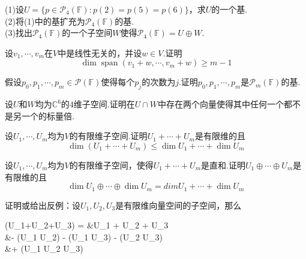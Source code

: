 \documentclass[lang=cn, zihao=5]{elegantbook}
\newcommand{\C}{\mathbb{C}}
\newcommand{\F}{\mathbb{F}}
\DeclareMathOperator{\spn}{span}
\begin{document}
\begin{exercise}
	(1)设$U=\{ p \in \mathcal{P}_{4} (\F) : p(2)=p(5)=p(6) \}$，求$U$的一个基. \\
	(2)将(1)中的基扩充为$\mathcal{P}_{4} (\F)$的基. \\
	(3)找出$\mathcal{P}_{4} (\F)$的一个子空间$W$使得$\mathcal{P}_{4} (\F) = U \oplus W$.
\end{exercise}

\begin{exercise}
	设$v_1, \cdots ,v_m$在$V$中是线性无关的，并设$w \in V$.证明$$\dim \spn (v_1+w, \cdots ,v_m+w) \geq m-1$$
\end{exercise}

\begin{exercise}
	假设$p_0,p_1, \cdots ,p_m \in \mathcal{P} (\F)$使得每个$p_j$的次数为$j$.证明$p_0,p_1, \cdots ,p_m$是$\mathcal{P}_m (\F)$的基.
\end{exercise}

\begin{exercise}
	设$U$和$W$均为$\C ^{6}$的$4$维子空间.证明在$U \cap W$中存在两个向量使得其中任何一个都不是另一个的标量倍.
\end{exercise}

\begin{exercise}
	设$U_1,\cdots ,U_m$均为$V$的有限维子空间.证明$U_1 + \cdots + U_m$是有限维的且$$\dim (U_1 + \cdots + U_m) \leq \dim U_1 +\cdots + \dim U_m$$
\end{exercise}

\begin{exercise}
	设$U_1,\cdots ,U_m$均为$V$的有限维子空间，使得$U_1 + \cdots + U_m$是直和.证明$U_1 \oplus \cdots \oplus U_m$是有限维的且$$\dim U_1 \oplus \cdots \oplus \dim U_m = dim U_1 +\cdots + \dim U_m$$
\end{exercise}

\begin{exercise}
	证明或给出反例：设$U_1,U_2,U_3$是有限维向量空间的子空间，那么
	\begin{split}
		\dim (U_1+U_2+U_3) = &\dim U_1 + \dim U_2 + \dim U_3 \\ 
		&- \dim (U_1 \cap U_2) - \dim (U_1 \cap U_3) - \dim (U_2 \cap U_3) \\
		&+ \dim (U_1 \cap U_2 \cap U_3)
	\end{split}
\end{exercise}
\end{document}
